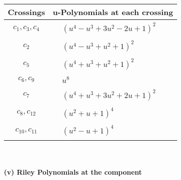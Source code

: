 \documentclass[1p]{elsarticle_modified}
\theoremstyle{definition}
\begin{document}
\begin{tabular}{m{50pt}|m{274pt}}
Crossings & \hspace{64pt}u-Polynomials at each crossing \\
\hline $$\begin{aligned}c_{1},c_{3},c_{4}\end{aligned}$$&$\begin{aligned}
&(u^4- u^3+3 u^2-2 u+1)^2
\end{aligned}$\\
\hline $$\begin{aligned}c_{2}\end{aligned}$$&$\begin{aligned}
&(u^4- u^3+u^2+1)^2
\end{aligned}$\\
\hline $$\begin{aligned}c_{5}\end{aligned}$$&$\begin{aligned}
&(u^4+u^3+u^2+1)^2
\end{aligned}$\\
\hline $$\begin{aligned}c_{6},c_{9}\end{aligned}$$&$\begin{aligned}
&u^8
\end{aligned}$\\
\hline $$\begin{aligned}c_{7}\end{aligned}$$&$\begin{aligned}
&(u^4+u^3+3 u^2+2 u+1)^2
\end{aligned}$\\
\hline $$\begin{aligned}c_{8},c_{12}\end{aligned}$$&$\begin{aligned}
&(u^2+u+1)^4
\end{aligned}$\\
\hline $$\begin{aligned}c_{10},c_{11}\end{aligned}$$&$\begin{aligned}
&(u^2- u+1)^4
\end{aligned}$\\
\hline
\end{tabular}\\~\\
\newpage\renewcommand{\arraystretch}{1}
\flushleft \textbf{(v) Riley Polynomials at the component}\newline \\
\end{document}
